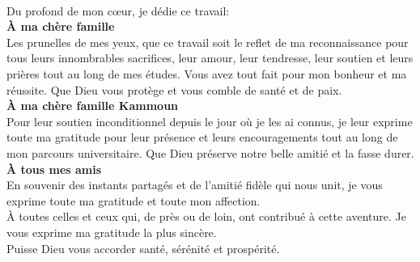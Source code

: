 \begin{center}
\itshape
~\par Du profond de mon cœur, je dédie ce travail:\\
[1cm]
\textbf{À ma chère famille}\\
Les prunelles de mes yeux, que ce travail soit le reflet de ma reconnaissance pour tous leurs innombrables sacrifices, leur amour, leur tendresse, leur soutien et leurs prières tout au long de mes études. Vous avez tout fait pour mon bonheur et ma réussite. Que Dieu vous protège et vous comble de santé et de paix.\\
[1cm]
\textbf{À ma chère famille Kammoun}\\
Pour leur soutien inconditionnel depuis le jour où je les ai connus, je leur exprime toute ma gratitude pour leur présence et leurs encouragements tout au long de mon parcours universitaire. Que Dieu préserve notre belle amitié et la fasse durer.\\
[1cm]
\textbf{À tous mes amis}\\
En souvenir des instants partagés et de l’amitié fidèle qui nous unit, je vous exprime toute ma gratitude et toute mon affection.\\
[1cm]
À toutes celles et ceux qui, de près ou de loin, ont contribué à cette aventure. Je vous
exprime ma gratitude la plus sincère.\\
Puisse Dieu vous accorder santé, sérénité et prospérité.\\
[2cm]
\end{center}


